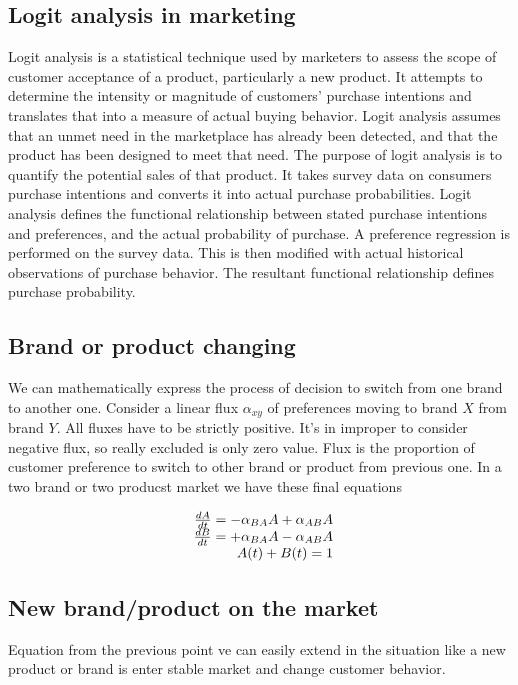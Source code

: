 \subsection{Logit analysis in marketing} \label{subsec:logit}
Logit analysis is a statistical technique used by marketers to assess the scope of customer acceptance of a product, particularly a new product.
It attempts to determine the intensity or magnitude of customers' purchase intentions and translates that into a measure of actual buying behavior.
Logit analysis assumes that an unmet need in the marketplace has already been detected, and that the product has been designed to meet that need.
The purpose of logit analysis is to quantify the potential sales of that product.
It takes survey data on consumers purchase intentions and converts it into actual purchase probabilities.
Logit analysis defines the functional relationship between stated purchase intentions and preferences, and the actual probability of purchase.
A preference regression is performed on the survey data.
This is then modified with actual historical observations of purchase behavior.
The resultant functional relationship defines purchase probability.

\subsection{Brand or product changing} \label{subsec:brand}
We can mathematically express the process of decision to switch from one brand to another one.
Consider a linear flux $\alpha_{xy}$ of preferences moving to brand $X$ from brand $Y$.
All fluxes have to be strictly positive.
It's in improper to consider negative flux, so really excluded is only zero value.
Flux is the proportion of customer preference to switch to other brand or product from previous one.
In a two brand or two producst market we have these final equations

\begin{equation} \label{eq:10}
\begin{array}{r@{}l}
\frac{dA}{dt} = -\alpha_{BA}A + \alpha_{AB}A \\
\frac{dB}{dt} = +\alpha_{BA}A - \alpha_{AB}A \\
A(t) + B(t) = 1
\end{array}
\end{equation}

\subsection{New brand/product on the market} \label{subsec:newbrand}
Equation from the previous point ve can easily extend in the situation like a new product or brand is enter
stable market and change customer behavior.

